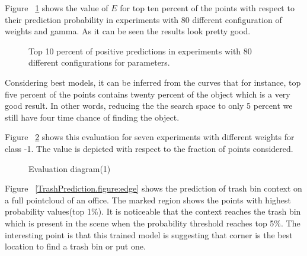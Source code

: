 Figure ~\ref{Eval80ExperimentTop10.figure} shows the value of $E$ for top ten percent of the points with respect to their 
prediction probability in experiments with 80 different configuration of weights and gamma.
As it can be seen the results look pretty good.

\begin{figure}[t]
  \caption[Evaluation result of 80 experiments]
  {Top 10 percent of positive predictions in experiments with 80 different configurations for parameters.}
  \label{Eval80ExperimentTop10.figure}
\end{figure}

Considering best models, it can be inferred from the curves that for instance, top five percent of the points contains twenty 
percent of the object which is a very good result. 
In other words, reducing the the search space to only 5 percent we still have four time chance of finding the object.

Figure ~\ref{evalSevenExp.figure} shows this evaluation for seven experiments with different weights for class -1. 
The value is depicted with respect to the fraction of points considered.

\begin{figure}[t]
  \caption[Evaluation diagram(1)]
  {Evaluation diagram(1)}
  \label{evalSevenExp.figure}
\end{figure}

Figure ~\ref{TrashPrediction.figure:edge} shows the prediction of trash bin context on a full pointcloud of an office. 
The marked region shows the points with highest probability values(top 1\%).
It is noticeable that the context reaches the trash bin which is present in the scene when the probability threshold 
reaches top 5\%.
The interesting point is that this trained model is suggesting that corner is the best location to find a trash bin 
or put one.

